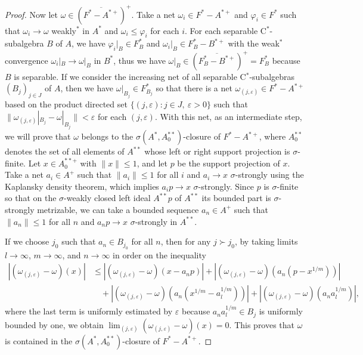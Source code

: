 \documentclass[a4paper]{amsart}
\newcommand{\e}{\varepsilon}
\theoremstyle{plain}
\theoremstyle{definition}
\begin{document}
\begin{proof}
Now let $\omega\in(\overline{F^*-A^{*+}})^+$.
Take a net $\omega_i\in F^*-A^{*+}$ and $\varphi_i\in F^*$ such that $\omega_i\to\omega$ weakly$^*$ in $A^*$ and $\omega_i\le\varphi_i$ for each $i$.
For each separable C$^*$-subalgebra $B$ of $A$, we have $\varphi_i|_B\in F^*_{B}$ and $\omega_i|_B\in F^*_B-B^{*+}$ with the weak$^*$ convergence $\omega_i|_B\to\omega|_B$ in $B^*$, thus we have $\omega|_B\in(\overline{F_B^*-B^{*+}})^+=F_B^*$ because $B$ is separable.
If we consider the increasing net of all separable C$^*$-subalgebras $(B_j)_{j\in J}$ of $A$, then we have $\omega|_{B_j}\in F_{B_j}^*$ so that there is a net $\omega_{(j,\e)}\in F^*-A^{*+}$ based on the product directed set $\{(j,\e):j\in J,\ \e>0\}$ such that $\|\omega_{(j,\e)}|_{B_j}-\omega|_{B_j}\|<\e$ for each $(j,\e)$.
With this net, as an intermediate step, we will prove that $\omega$ belongs to the $\sigma(A^*,A_0^{**})$-closure of $F^*-A^{*+}$, where $A_0^{**}$ denotes the set of all elements of $A^{**}$ whose left or right support projection is $\sigma$-finite.
Let $x\in A_0^{**+}$ with $\|x\|\le1$, and let $p$ be the support projection of $x$.
Take a net $a_i\in A^+$ such that $\|a_i\|\le1$ for all $i$ and $a_i\to x$ $\sigma$-strongly using the Kaplansky density theorem, which implies $a_ip\to x$ $\sigma$-strongly.
Since $p$ is $\sigma$-finite so that on the $\sigma$-weakly closed left ideal $A^{**}p$ of $A^{**}$ its bounded part is $\sigma$-strongly metrizable, we can take a bounded sequence $a_n\in A^+$ such that $\|a_n\|\le1$ for all $n$ and $a_np\to x$ $\sigma$-strongly in $A^{**}$.

If we choose $j_0$ such that $a_n\in B_{j_0}$ for all $n$, then for any $j\succ j_0$, by taking limits $l\to\infty$, $m\to\infty$, and $n\to\infty$ in order on the inequality
\begin{align*}
|(\omega_{(j,\e)}-\omega)(x)|
&\le|(\omega_{(j,\e)}-\omega)(x-a_np)|+|(\omega_{(j,\e)}-\omega)(a_n(p-x^{1/m}))|\\
&\quad+|(\omega_{(j,\e)}-\omega)(a_n(x^{1/m}-a_l^{1/m}))|+|(\omega_{(j,\e)}-\omega)(a_na_l^{1/m})|,
\end{align*}
where the last term is uniformly estimated by $\e$ because $a_na_l^{1/m}\in B_j$ is uniformly bounded by one, we obtain $\lim_{(j,\e)}(\omega_{(j,\e)}-\omega)(x)=0$.
This proves that $\omega$ is contained in the $\sigma(A^*,A_0^{**})$-closure of $F^*-A^{*+}$.




\end{proof}
\end{document}
